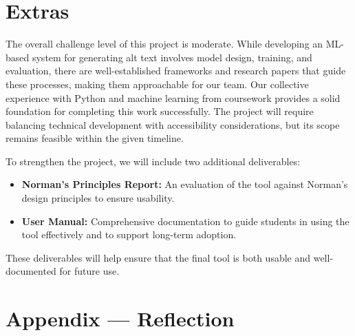 \documentclass{article}
\begin{document}
\section{Extras}

\noindent
The overall challenge level of this project is moderate. While developing an
ML-based system for generating alt text involves model design, training, and
evaluation, there are well-established frameworks and research papers that guide
these processes, making them approachable for our team. Our collective
experience with Python and machine learning from coursework provides a solid
foundation for completing this work successfully. The project will require balancing technical development with accessibility
considerations, but its scope remains feasible within the given timeline.

\vspace{0.75em}

\noindent
To strengthen the project, we will include two additional deliverables:

\vspace{0.5em}

\begin{itemize}
    \setlength\itemsep{0.5em}
    \item \textbf{Norman’s Principles Report:} An evaluation of the tool against
    Norman’s design principles to ensure usability.
    \item \textbf{User Manual:} Comprehensive documentation to guide students in
    using the tool effectively and to support long-term adoption.
\end{itemize}

\vspace{0.5em}

\noindent
These deliverables will help ensure that the final tool is both usable and
well-documented for future use.

\newpage{}

\section*{Appendix --- Reflection}


\end{document}
